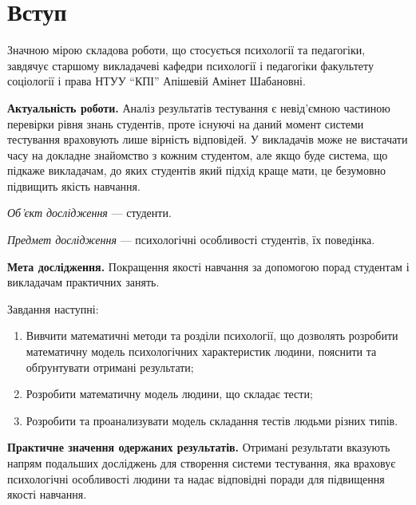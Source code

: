 \chapter*{Вступ}

Значною мірою складова роботи, що стосується психології та педагогіки, завдячує
старшому викладачеві кафедри психології і педагогіки
факультету соціології і права НТУУ ``КПІ'' Апішевій Амінет Шабановні.

\textbf{Актуальність роботи.}
Аналіз результатів тестування є невід’ємною частиною перевірки рівня знань
студентів, проте існуючі на даний момент системи тестування враховують
лише вірність відповідей.
У викладачів може не вистачати часу на докладне знайомство з кожним студентом,
але якщо буде система, що підкаже викладачам, до яких
студентів який підхід краще мати, це безумовно підвищить якість навчання.

\textit{Об’єкт дослідження} ---
студенти.

\textit{Предмет дослідження} ---
психологічні особливості студентів, їх поведінка.

\textbf{Мета дослідження.}
Покращення якості навчання за допомогою порад студентам і викладачам
практичних занять.

Завдання наступні:
\begin{enumerate}
  \item
    Вивчити математичні методи та розділи психології, що дозволять розробити
    математичну модель психологічних характеристик людини,
    пояснити та обґрунтувати отримані результати;
  \item
    Розробити математичну модель людини, що складає тести;
  \item
    Розробити та проанализувати модель складання тестів людьми різних типів.
\end{enumerate}

\textbf{Практичне значення одержаних результатів.}
Отримані результати
вказують напрям подальших досліджень для створення системи тестування,
яка враховує психологічні особливості людини та надає відповідні поради
для підвищення якості навчання.
